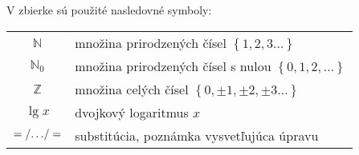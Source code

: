 V zbierke sú použité nasledovné symboly:
\begin{center}
\begin{tabular}{cl}
$\mathbb{N}$ & množina prirodzených čísel $\left\{1,2,3\ldots\right\}$\\
$\mathbb{N}_0$ & množina prirodzených čísel s nulou $\left\{0,1,2,\ldots\right\}$\\
$\mathbb{Z}$ & množina celých čísel $\left\{0,\pm1,\pm2,\pm3\ldots\right\}$\\
$\lg x$ & dvojkový logaritmus $x$\\
$=\left/\ldots\right/=$ & substitúcia, poznámka vysvetľujúca úpravu
\end{tabular}
\end{center}
